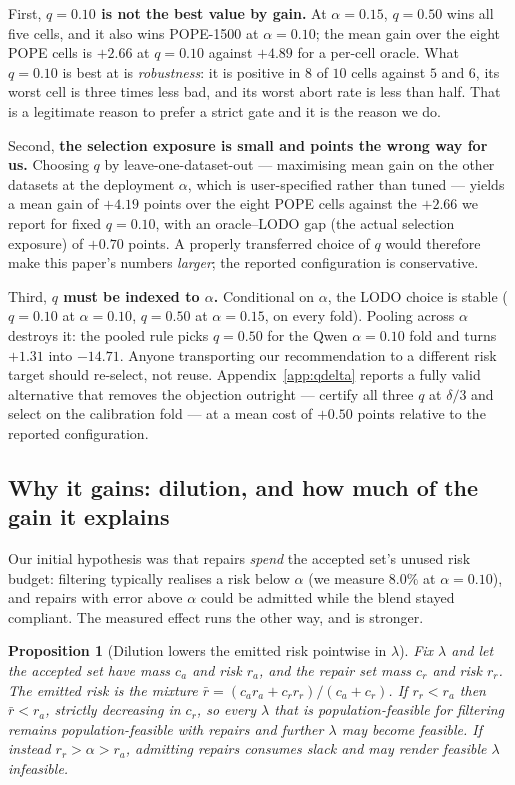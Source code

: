 \documentclass{article}
\theoremstyle{plain}
\newtheorem{proposition}{Proposition}
\theoremstyle{definition}
\theoremstyle{remark}
\begin{document}
First, \textbf{$q=0.10$ is not the best value by gain.} At $\alpha=0.15$, $q=0.50$ wins all
five cells, and it also wins POPE-1500 at $\alpha=0.10$; the mean gain over the eight POPE
cells is $+2.66$ at $q=0.10$ against $+4.89$ for a per-cell oracle. What $q=0.10$ is best at is
\emph{robustness}: it is positive in $8$ of $10$ cells against $5$ and $6$, its worst cell is
three times less bad, and its worst abort rate is less than half. That is a legitimate reason
to prefer a strict gate and it is the reason we do.

Second, \textbf{the selection exposure is small and points the wrong way for us.} Choosing $q$
by leave-one-dataset-out --- maximising mean gain on the other datasets at the deployment
$\alpha$, which is user-specified rather than tuned --- yields a mean gain of $+4.19$ points over
the eight POPE cells against the $+2.66$ we report for fixed $q=0.10$, with an oracle--LODO gap
(the actual selection exposure) of $+0.70$ points. A properly transferred choice of $q$ would
therefore make this paper's numbers \emph{larger}; the reported configuration is conservative.

Third, \textbf{$q$ must be indexed to $\alpha$.} Conditional on $\alpha$, the LODO choice is
stable ($q=0.10$ at $\alpha=0.10$, $q=0.50$ at $\alpha=0.15$, on every fold). Pooling across
$\alpha$ destroys it: the pooled rule picks $q=0.50$ for the Qwen $\alpha=0.10$ fold and turns
$+1.31$ into $-14.71$. Anyone transporting our recommendation to a different risk target should
re-select, not reuse. Appendix~\ref{app:qdelta} reports a fully valid alternative that removes
the objection outright --- certify all three $q$ at $\delta/3$ and select on the calibration fold
--- at a mean cost of $+0.50$ points relative to the reported configuration.

\subsection{Why it gains: dilution, and how much of the gain it explains}
\label{sec:mechanism}

Our initial hypothesis was that repairs \emph{spend} the accepted set's unused risk budget:
filtering typically realises a risk below $\alpha$ (we measure $8.0\%$ at $\alpha=0.10$),
and repairs with error above $\alpha$ could be admitted while the blend stayed compliant.
The measured effect runs the other way, and is stronger.

\begin{proposition}[Dilution lowers the emitted risk pointwise in $\lambda$]
\label{prop:dilution}
Fix $\lambda$ and let the accepted set have mass $c_a$ and risk $r_a$, and the repair set
mass $c_r$ and risk $r_r$. The emitted risk is the mixture
$\bar r=(c_ar_a+c_rr_r)/(c_a+c_r)$. If $r_r<r_a$ then $\bar r<r_a$, strictly decreasing in
$c_r$, so every $\lambda$ that is population-feasible for filtering remains
population-feasible with repairs and further $\lambda$ may become feasible. If instead
$r_r>\alpha>r_a$, admitting repairs consumes slack and may render feasible $\lambda$
infeasible.
\end{proposition}
\end{document}
